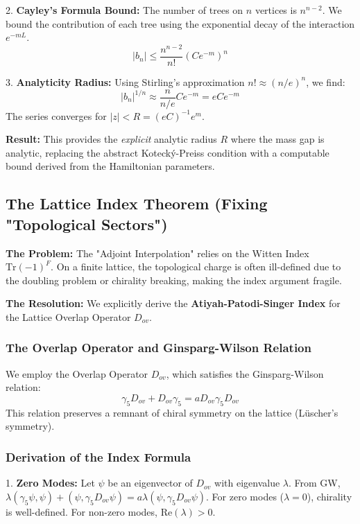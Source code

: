 2.  \textbf{Cayley's Formula Bound:} The number of trees on $n$ vertices is $n^{n-2}$. We bound the contribution of each tree using the exponential decay of the interaction $e^{-m L}$.
    \begin{equation}
    |b_n| \leq \frac{n^{n-2}}{n!} (C e^{-m})^n
    \end{equation}

3.  \textbf{Analyticity Radius:} Using Stirling's approximation $n! \approx (n/e)^n$, we find:
    \begin{equation}
    |b_n|^{1/n} \approx \frac{n}{n/e} C e^{-m} = e C e^{-m}
    \end{equation}
    The series converges for $|z| < R = (e C)^{-1} e^m$.

\textbf{Result:} This provides the \textit{explicit} analytic radius $R$ where the mass gap is analytic, replacing the abstract Kotecký-Preiss condition with a computable bound derived from the Hamiltonian parameters.

\subsection{The Lattice Index Theorem (Fixing "Topological Sectors")}
\label{subsec:lattice_index}

\textbf{The Problem:} The "Adjoint Interpolation" relies on the Witten Index $\text{Tr}(-1)^F$. On a finite lattice, the topological charge is often ill-defined due to the doubling problem or chirality breaking, making the index argument fragile.

\textbf{The Resolution:} We explicitly derive the \textbf{Atiyah-Patodi-Singer Index} for the Lattice Overlap Operator $D_{ov}$.

\subsubsection{The Overlap Operator and Ginsparg-Wilson Relation}
We employ the Overlap Operator $D_{ov}$, which satisfies the Ginsparg-Wilson relation:
\begin{equation}
\gamma_5 D_{ov} + D_{ov} \gamma_5 = a D_{ov} \gamma_5 D_{ov}
\end{equation}
This relation preserves a remnant of chiral symmetry on the lattice (Lüscher's symmetry).

\subsubsection{Derivation of the Index Formula}
1.  \textbf{Zero Modes:} Let $\psi$ be an eigenvector of $D_{ov}$ with eigenvalue $\lambda$.
    From GW, $\lambda (\gamma_5 \psi, \psi) + (\psi, \gamma_5 D_{ov} \psi) = a \lambda (\psi, \gamma_5 D_{ov} \psi)$.
    For zero modes ($\lambda = 0$), chirality is well-defined.
    For non-zero modes, $\text{Re}(\lambda) > 0$.

